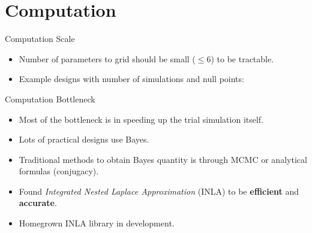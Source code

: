\section{Computation}
\frame{\tableofcontents[currentsection]}

\begin{frame}{Computation Scale}
\begin{itemize}
    \item Number of parameters to grid should be small ($\leq 6$) to be tractable.
    \item Example designs with number of simulations and null points:
\end{itemize}
\end{frame}

\begin{frame}{Computation Bottleneck}
\begin{itemize}
    \item Most of the bottleneck is in speeding up the trial simulation itself.
    \item Lots of practical designs use Bayes.
    \item Traditional methods to obtain Bayes quantity is through MCMC or analytical formulas (conjugacy).
    \item Found \emph{Integrated Nested Laplace Approximation} (INLA) to be \textbf{efficient} and \textbf{accurate}.
    \item Homegrown INLA library in development.
\end{itemize}
\end{frame}


